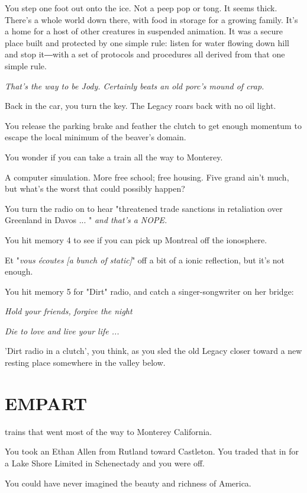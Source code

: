 \documentclass[a5paper, symmetric]{tufte-book}
\begin{document}
You step one foot out onto the ice. Not a peep pop or tong. It seems thick. There's a whole world down there, with food in storage for a growing family. It's a home for a host of other creatures in suspended animation. It was a secure place built and protected by one simple rule: listen for water flowing down hill and stop it―with a set of protocols and procedures all derived from that one simple rule. 

\textit{That's the way to be Jody. Certainly beats an old porc's mound of crap.}

Back in the car, you turn the key. The Legacy roars back with no oil light. 

You release the parking brake and feather the clutch to get enough momentum to escape the local minimum of the beaver's domain.

You wonder if you can take a train all the way to Monterey. 

A computer simulation. More free school; free housing. Five grand ain't much, but what's the worst that could possibly happen?

You turn the radio on to hear "threatened trade sanctions in retaliation over Greenland in Davos ... " \textit{and that's a NOPE.}

You hit memory 4 to see if you can pick up Montreal off the ionosphere. 

Et "\textit{vous écoutes} \textit{[a bunch of static]}" off a bit of a ionic reflection, but it's not enough.

You hit memory 5 for "Dirt" radio, and catch a singer-songwriter on her bridge:

\textit{Hold your friends, forgive the night}

\textit{Die to love and live your life ...}

'Dirt radio in a clutch', you think, as you sled the old Legacy closer toward a new resting place somewhere in the valley below. 

\chapter{EMPART}
\label{ch:sunday}

 trains that went most of the way to Monterey California. 

You took an Ethan Allen from Rutland toward Castleton. You traded that in for a Lake Shore Limited in Schenectady and you were off.

You could have never imagined the beauty and richness of America. 
\end{document}
